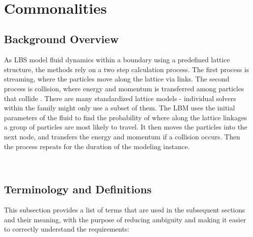 \documentclass[12pt]{article}
\begin{document}
~\newpage

\section{Commonalities}

\subsection{Background Overview} \label{Sec_Background}

As LBS model fluid dynamics within a boundary using a predefined lattice structure, the methods rely on a two step calculation process. The first process is streaming, where the particles move along the lattice via links. The second process is collision, where energy and momentum is transferred among particles that collide \cite{bao2011lattice}.
There are many standardized lattice models - individual solvers within the family might only use a subset of them.
The LBM uses the initial parameters of the fluid to find the probability of where along the lattice linkages a group of particles are most likely to travel. It then moves the particles into the next node, and transfers the energy and momentum if a collision occurs. Then the process repeats for the duration of the modeling instance.

~\newpage

\subsection{Terminology and  Definitions}
\label{termdef}

This subsection provides a list of terms that are used in the subsequent
sections and their meaning, with the purpose of reducing ambiguity and making it
easier to correctly understand the requirements:
\end{document}
